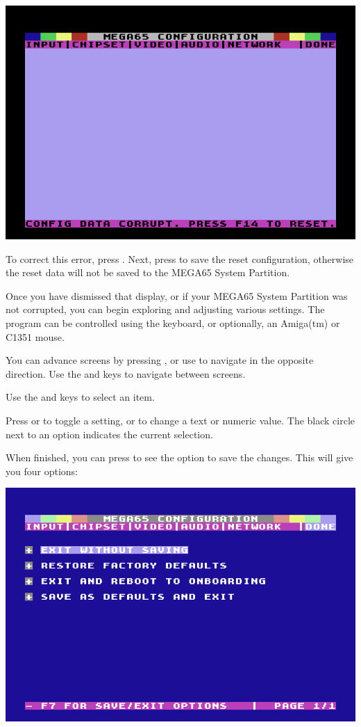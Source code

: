 \begin{center}
  \includegraphics[width=0.7\linewidth]{images/ss-m65config-corrupt.png}
\end{center}

To correct this error, press . Next, press  to save the reset configuration, otherwise the reset data will not be saved to the MEGA65 System
Partition.

Once you have dismissed that display, or if your MEGA65 System Partition was not corrupted, you can begin exploring and adjusting various settings. The program can be controlled using the keyboard, or optionally, an Amiga(tm) or C1351 mouse.

You can advance screens by pressing , or use  to navigate in the opposite direction. Use the \megakey{$\leftarrow$} and \megakey{$\rightarrow$} keys to navigate between screens.

Use the \megakey{$\uparrow$} and \megakey{$\downarrow$} keys to select an item.

Press  or  to toggle a setting, or to change a text or numeric value. The black circle next to an option indicates the current selection.

  When finished, you can press  to see the
  option to save the changes. This will give you four options:

\begin{center}
  \includegraphics[trim= 0 20mm 0 20mm,clip,width=0.7\linewidth]{images/ss-m65config-save.png}
\end{center}


